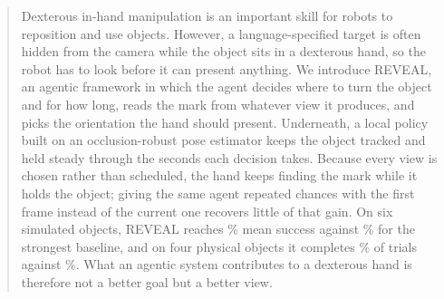 \begin{abstract}
Dexterous in-hand manipulation is an important skill for robots to reposition and use objects. However, a language-specified target is often hidden from the camera while the object sits in a dexterous hand, so the robot has to look before it can present anything. We introduce REVEAL, an agentic framework in which the agent decides where to turn the object and for how long, reads the mark from whatever view it produces, and picks the orientation the hand should present. Underneath, a local policy built on an occlusion-robust pose estimator keeps the object tracked and held steady through the seconds each decision takes. Because every view is chosen rather than scheduled, the hand keeps finding the mark while it holds the object; giving the same agent repeated chances with the first frame instead of the current one recovers little of that gain. On six simulated objects, REVEAL reaches \QOneOriginalSuccess\% mean success against \QOneOriginalBaseline\% for the strongest baseline, and on four physical objects it completes \HardwareAimiSuccess\% of trials against \HardwareFineTunedSuccess\%. What an agentic system contributes to a dexterous hand is therefore not a better goal but a better view.
\end{abstract}
